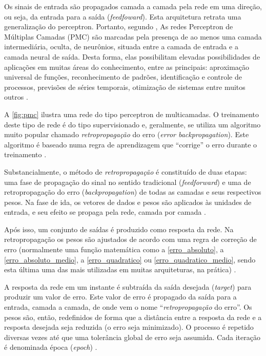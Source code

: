 Os sinais de entrada são propagados camada a camada pela rede em uma direção, ou seja, da entrada para a saída (\textit{feedfoward}). Esta arquitetura retrata uma generalização do perceptron. Portanto, segundo , As redes Perceptron de Múltiplas Camadas (PMC) são marcadas pela presença de ao menos uma camada intermediária, oculta, de neurônios, situada entre a camada de entrada e a camada neural de saída. Desta forma, elas possibilitam elevadas possibilidades de aplicações em muitas áreas do conhecimento, entre as principais: aproximação universal de funções, reconhecimento de padrões, identificação e controle de processos, previsões de séries temporais, otimização de sistemas entre muitos outros \cite{haykin_redes_2001}.

A \autoref{fig:pmc} ilustra uma rede do tipo perceptron de multicamadas. O treinamento deste tipo de rede é do tipo supervisionado e, geralmente, se utiliza um algoritmo muito popular chamado \textit{retropropagação} do erro (\textit{error backpropagation}). Este algoritmo é baseado numa regra de aprendizagem que “corrige” o erro durante o treinamento \cite{haykin_redes_2001}.

Substancialmente, o método de \textit{retropropagação} é constituído de duas etapas: uma fase de propagação do sinal no sentido tradicional (\textit{feedforward}) e uma de retropropagação do erro (\textit{backpropagation}) de todas as camadas e seus respectivos pesos. Na fase de ida, os vetores de dados e pesos são aplicados às unidades de entrada, e seu efeito se propaga pela rede, camada por camada \cite{hagan_neural_1996,haykin_redes_2001}.

Após isso, um conjunto de saídas é produzido como resposta da rede. Na retropropagação os pesos são ajustados de acordo com uma regra de correção de erro (normalmente uma função matemática como a \autoref{erro_absoluto}, a \autoref{erro_absoluto_medio}, a \autoref{erro_quadratico} ou \autoref{erro_quadratico_medio}, sendo esta última uma das mais utilizadas em muitas arquiteturas, na prática) \cite{haykin_redes_2001, hagan_neural_1996, yeung_neural_2004}.

A resposta da rede em um instante é subtraída da saída desejada (\textit{target}) para produzir um valor de erro. Este valor de erro é propagado da saída para a entrada, camada a camada, de onde vem o nome ``\textit{retropropagação} do erro''. Os pesos são, então, redefinidos de forma que a distância entre a resposta da rede e a resposta desejada seja reduzida (o erro seja minimizado). O processo é repetido diversas vezes até que uma tolerância global de erro seja assumida. Cada iteração é denominada época (\textit{epoch}) \cite{haykin_redes_2001, hagan_neural_1996, minsky_perceptrons:_1969}.

